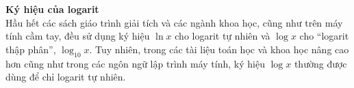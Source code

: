 
\noindent
\begin{minipage}[t]{0.26\textwidth}
    \vspace{0pt}
    \vspace*{16pt}
    \footnotesize
    \noindent\textbf{\textsf{Ký hiệu của logarit}}\\[4pt]
    Hầu hết các sách giáo trình giải tích và các ngành khoa học, cũng như trên máy tính cầm tay, đều sử dụng ký hiệu $\ln x$ cho logarit tự nhiên và $\log x$ cho ``logarit thập phân'', $\log_{10} x$. Tuy nhiên, trong các tài liệu toán học và khoa học nâng cao hơn cũng như trong các ngôn ngữ lập trình máy tính, ký hiệu $\log x$ thường được dùng để chỉ logarit tự nhiên.
\end{minipage}%
\hfill
